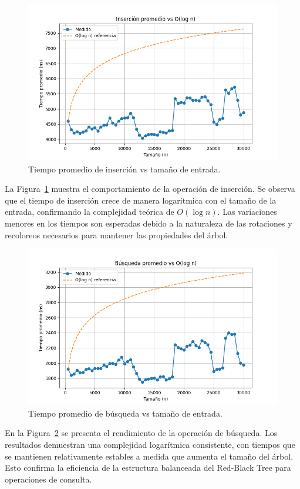 \documentclass[conference]{IEEEtran}
\begin{document}
\begin{figure}[H]
    \centering
    \includegraphics[width=0.9\columnwidth]{insert.png}
    \caption{Tiempo promedio de inserción vs tamaño de entrada.}
    \label{fig:insert_performance}
\end{figure}

La Figura~\ref{fig:insert_performance} muestra el comportamiento de la operación de inserción. Se observa que el tiempo de inserción crece de manera logarítmica con el tamaño de la entrada, confirmando la complejidad teórica de $O(\log n)$. Las variaciones menores en los tiempos son esperadas debido a la naturaleza de las rotaciones y recoloreos necesarios para mantener las propiedades del árbol.

\begin{figure}[H]
    \centering
    \includegraphics[width=0.9\columnwidth]{search.png}
    \caption{Tiempo promedio de búsqueda vs tamaño de entrada.}
    \label{fig:search_performance}
\end{figure}

En la Figura~\ref{fig:search_performance} se presenta el rendimiento de la operación de búsqueda. Los resultados demuestran una complejidad logarítmica consistente, con tiempos que se mantienen relativamente estables a medida que aumenta el tamaño del árbol. Esto confirma la eficiencia de la estructura balanceada del Red-Black Tree para operaciones de consulta.
\end{document}
